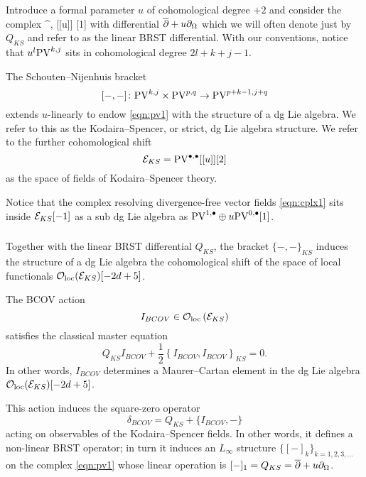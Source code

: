 \documentclass[11pt]{amsart}
\begin{document}
Introduce a formal parameter $u$ of cohomological degree $+2$ and consider the complex 
\beqn\label{eqn:pv1}
\PV^{\bu,\bu} [[u]] [1]
\eeqn
with differential $\overline{\partial} + u \partial_{\Omega}$ which we will often denote just by $Q_{KS}$ and refer to as the linear BRST differential. 
With our conventions, notice that $u^l {\rm PV}^{k,j}$ sits in cohomological degree $2l +k + j - 1$. 

The Schouten--Nijenhuis bracket 
\[
[-,-] \colon {\rm PV}^{k,j} \times {\rm PV}^{p,q} \to {\rm PV}^{p+k-1,j+q} 
\]
extends $u$-linearly to endow \eqref{eqn:pv1} with the structure of a dg Lie algebra.
We refer to this as the Kodaira--Spencer, or strict, dg Lie algebra structure.
We refer to the further cohomological shift 
\[
\mathcal E_{KS} = {\rm PV}^{\bullet,\bullet} [[u]] [2]
\]
as the space of fields of Kodaira--Spencer theory.

Notice that the complex resolving divergence-free vector fields \eqref{eqn:cplx1} sits inside $\mathcal E_{KS} [-1]$ as a sub dg Lie algebra as ${\rm PV}^{1,\bullet} \oplus u {\rm PV}^{0,\bullet}[1]$. 

\subsubsection{}


\subsubsection{}

Together with the linear BRST differential $Q_{KS}$, the bracket $\{-,-\}_{KS}$ induces the structure of a dg Lie algebra the cohomological shift of the space of local functionals ${\mathcal O}_{\rm loc}(\mathcal E_{KS})[-2d+5]$. 

\begin{thm}
The BCOV action 
\[
I_{BCOV} \in {\mathcal O}_{\rm loc} \left(\mathcal E_{KS} \right) 
\]
satisfies the classical master equation 
\[
Q_{KS} I_{BCOV} + \frac12 \left\{I_{BCOV}, I_{BCOV}\right\}_{KS} = 0 .
\]
In other words, $I_{BCOV}$ determines a Maurer--Cartan element in the dg Lie algebra ${\mathcal O}_{\rm loc}(\mathcal E_{KS})[-2d+5]$.
\end{thm}

This action induces the square-zero operator 
\[
\delta_{BCOV} = Q_{KS} + \{I_{BCOV}, -\} 
\]
acting on observables of the Kodaira--Spencer fields. 
In other words, it defines a non-linear BRST operator; in turn it
induces an $L_\infty$ structure $\{[-]_k\}_{k =1,2,3,\ldots}$ on the complex \eqref{eqn:pv1} whose linear operation is $[-]_1 = Q_{KS} = \overline{\partial} + u\partial_{\Omega}$. 
\end{document}
